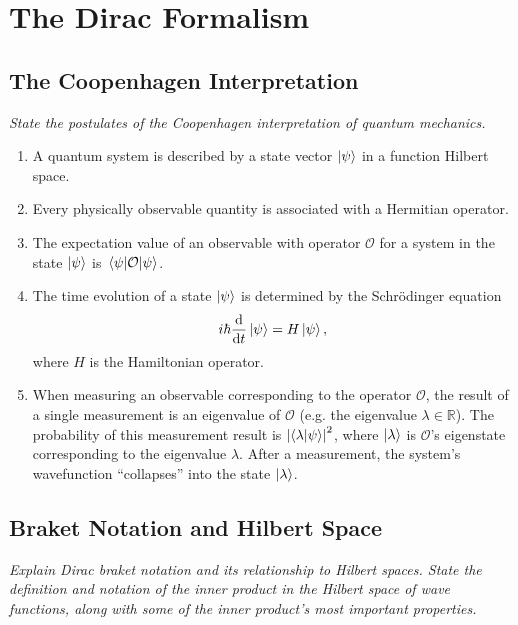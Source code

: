 \documentclass[11pt, a4paper]{article}
\newcommand{\Schro}{Schr\"{o}dinger\xspace}
\renewcommand{\O}{\mathcal{O}}  %
\begin{document}
\newpage

\section{The Dirac Formalism}

\subsection{The Coopenhagen Interpretation}
\textit{State the postulates of the Coopenhagen interpretation of quantum mechanics.}
\begin{enumerate}
	\item A quantum system is described by a state vector $ \ket{\psi} $ in a function Hilbert space.
	
	\item Every physically observable quantity is associated with a Hermitian operator.
	
	\item The expectation value of an observable with operator $ \O $ for a system in the state $ \ket{\psi} $ is $ \mel{\psi}{\O}{\psi} $.
	
	\item The time evolution of a state $ \ket{\psi} $ is determined by the \Schro equation
	\begin{equation*}
		i \hbar \dv{t} \ket{\psi} = H \ket{\psi},
	\end{equation*}
	where $ H $ is the Hamiltonian operator.
	
	\item When measuring an observable corresponding to the operator $ \O $, the result of a single measurement is an eigenvalue of $ \O $ (e.g. the eigenvalue $ \lambda \in \mathbb{R} $). The probability of this measurement result is $ \abs{\braket{\lambda}{\psi}}^{2} $, where $ \ket{\lambda} $ is $ \O $'s eigenstate corresponding to the eigenvalue $ \lambda $. After a measurement, the system's wavefunction ``collapses'' into the state $ \ket{\lambda} $.
\end{enumerate}

\subsection{Braket Notation and Hilbert Space}
\textit{Explain Dirac braket notation and its relationship to Hilbert spaces. State the definition and notation of the inner product in the Hilbert space of wave functions, along with some of the inner product's most important properties.}
\end{document}
